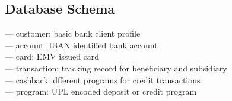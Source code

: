 \subsection{Database Schema}

— customer: basic bank client profile \\ %
— account: IBAN identified bank account \\
— card: EMV issued card\\
— transaction: tracking record for beneficiary and subsidiary\\
— cashback: dfferent programs for credit transactions\\
— program: UPL encoded deposit or credit program\\

